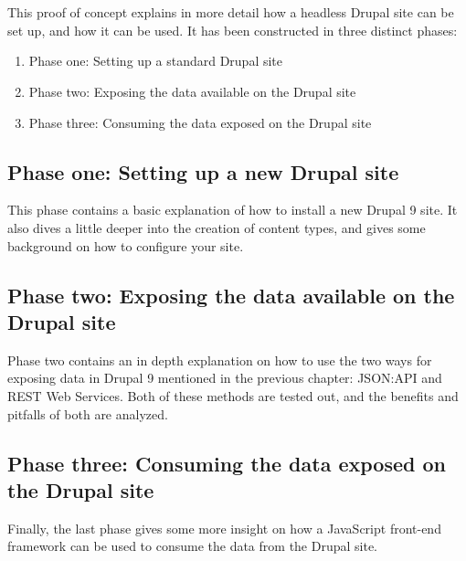 
\chapter{}
\label{ch:methodologie}



This proof of concept explains in more detail how a headless Drupal site can be set up, and how it can be used. It has been constructed in three distinct phases: 
\begin{enumerate}
	\item  Phase one: Setting up a standard Drupal site
	\item  Phase two: Exposing the data available on the Drupal site
	\item  Phase three: Consuming the data exposed on the Drupal site
\end{enumerate}

\section{Phase one: Setting up a new Drupal site}

This phase contains a basic explanation of how to install a new Drupal 9 site. It also dives a little deeper into the creation of content types, and gives some background on how to configure your site.

\section{Phase two: Exposing the data available on the Drupal site}

Phase two contains an in depth explanation on how to use the two ways for exposing data in Drupal 9 mentioned in the previous chapter: JSON:API and REST Web Services. Both of these methods are tested out, and the benefits and pitfalls of both are analyzed.

\section{Phase three: Consuming the data exposed on the Drupal site}

Finally, the last phase gives some more insight on how a JavaScript front-end framework can be used to consume the data from the Drupal site.